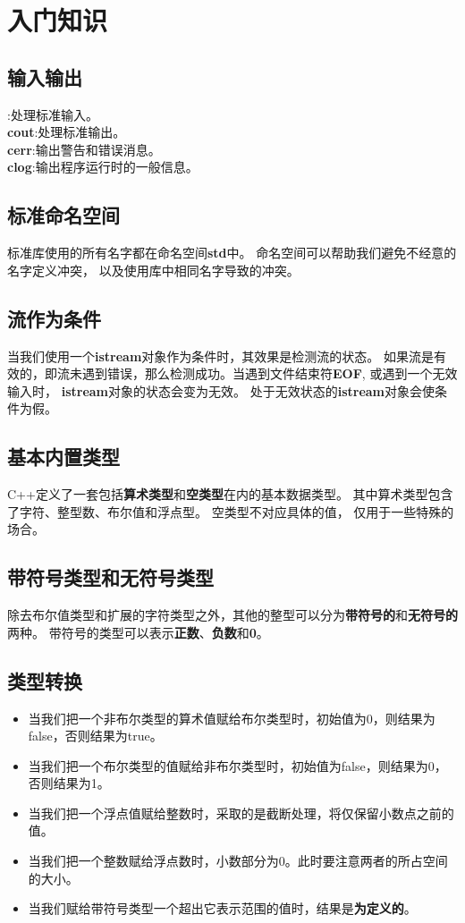 \chapter{入门知识}
\section{输入输出}
:处理标准输入。\\
{\bfseries{cout}}:处理标准输出。\\
{\bfseries{cerr}}:输出警告和错误消息。\\
{\bfseries{clog}}:输出程序运行时的一般信息。

\section{标准命名空间}
标准库使用的所有名字都在命名空间{\bfseries{std}}中。%
命名空间可以帮助我们避免不经意的名字定义冲突，%
以及使用库中相同名字导致的冲突。%

\section{流作为条件}
当我们使用一个{\bfseries{istream}}对象作为条件时，其效果是检测流的状态。%
如果流是有效的，即流未遇到错误，那么检测成功。当遇到文件结束符{\bfseries{EOF}},%
或遇到一个无效输入时，%
{\bfseries{istream}}对象的状态会变为无效。%
处于无效状态的{\bfseries{istream}}对象会使条件为假。

\section{基本内置类型}
C++定义了一套包括{\bfseries{算术类型}}和{\bfseries{空类型}}在内的基本数据类型。%
其中算术类型包含了字符、整型数、布尔值和浮点型。%
空类型不对应具体的值，%
仅用于一些特殊的场合。%

\section{带符号类型和无符号类型}
除去布尔值类型和扩展的字符类型之外，其他的整型可以分为{\bfseries{带符号的}}和{\bfseries{无符号的}}两种。%
带符号的类型可以表示{\bfseries{正数}}、{\bfseries{负数}}和{\bfseries{0}}。%

\section{类型转换}
\begin{itemize}
\item{当我们把一个非布尔类型的算术值赋给布尔类型时，初始值为0，则结果为false，否则结果为true。}
\item{当我们把一个布尔类型的值赋给非布尔类型时，初始值为false，则结果为0，否则结果为1。}
\item{当我们把一个浮点值赋给整数时，采取的是截断处理，将仅保留小数点之前的值。}
\item{当我们把一个整数赋给浮点数时，小数部分为0。此时要注意两者的所占空间的大小。}
\item{当我们赋给带符号类型一个超出它表示范围的值时，结果是{\bfseries{为定义的}}。}
\end{itemize}

